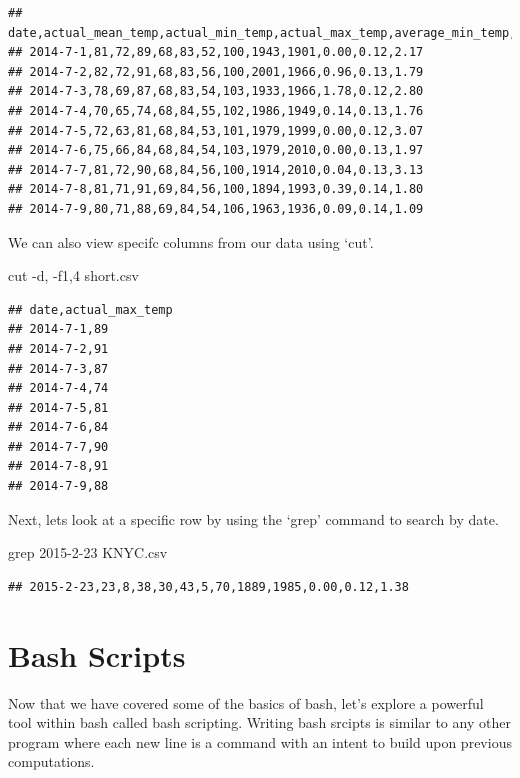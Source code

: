 \documentclass[]{book}
\newenvironment{Shaded}{\begin{snugshade}}{\end{snugshade}}
\newcommand{\FunctionTok}[1]{\textcolor[rgb]{0.00,0.00,0.00}{#1}}
\newcommand{\NormalTok}[1]{#1}
\begin{document}
\begin{verbatim}
## date,actual_mean_temp,actual_min_temp,actual_max_temp,average_min_temp,average_max_temp,record_min_temp,record_max_temp,record_min_temp_year,record_max_temp_year,actual_precipitation,average_precipitation,record_precipitation
## 2014-7-1,81,72,89,68,83,52,100,1943,1901,0.00,0.12,2.17
## 2014-7-2,82,72,91,68,83,56,100,2001,1966,0.96,0.13,1.79
## 2014-7-3,78,69,87,68,83,54,103,1933,1966,1.78,0.12,2.80
## 2014-7-4,70,65,74,68,84,55,102,1986,1949,0.14,0.13,1.76
## 2014-7-5,72,63,81,68,84,53,101,1979,1999,0.00,0.12,3.07
## 2014-7-6,75,66,84,68,84,54,103,1979,2010,0.00,0.13,1.97
## 2014-7-7,81,72,90,68,84,56,100,1914,2010,0.04,0.13,3.13
## 2014-7-8,81,71,91,69,84,56,100,1894,1993,0.39,0.14,1.80
## 2014-7-9,80,71,88,69,84,54,106,1963,1936,0.09,0.14,1.09
\end{verbatim}

We can also view specifc columns from our data using `cut'.

\begin{Shaded}
\begin{Highlighting}[]
\FunctionTok{cut}\NormalTok{ -d, -f1,4 short.csv}
\end{Highlighting}
\end{Shaded}

\begin{verbatim}
## date,actual_max_temp
## 2014-7-1,89
## 2014-7-2,91
## 2014-7-3,87
## 2014-7-4,74
## 2014-7-5,81
## 2014-7-6,84
## 2014-7-7,90
## 2014-7-8,91
## 2014-7-9,88
\end{verbatim}

Next, lets look at a specific row by using the `grep' command to search
by date.

\begin{Shaded}
\begin{Highlighting}[]
\FunctionTok{grep}\NormalTok{ 2015-2-23 KNYC.csv}
\end{Highlighting}
\end{Shaded}

\begin{verbatim}
## 2015-2-23,23,8,38,30,43,5,70,1889,1985,0.00,0.12,1.38
\end{verbatim}

\section{Bash Scripts}\label{bash-scripts}

Now that we have covered some of the basics of bash, let's explore a
powerful tool within bash called bash scripting. Writing bash srcipts is
similar to any other program where each new line is a command with an
intent to build upon previous computations.
\end{document}
